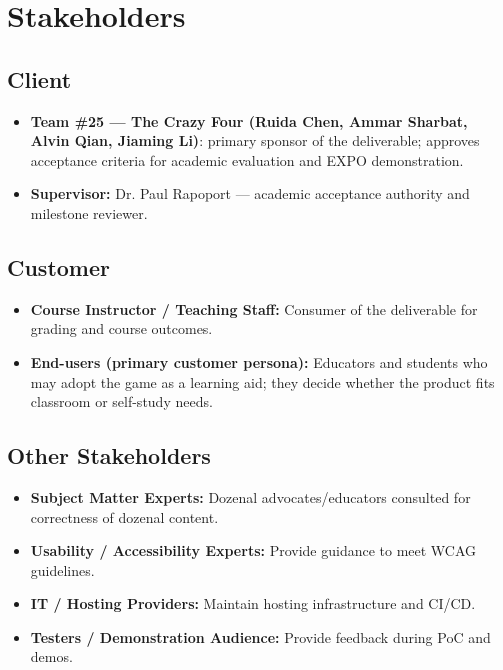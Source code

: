 \documentclass[12pt]{article}
\begin{document}
\section{Stakeholders}

\subsection{Client}
\begin{itemize}
  \item \textbf{Team \#25 — The Crazy Four (Ruida Chen, Ammar Sharbat, Alvin Qian, Jiaming Li)}: primary sponsor of the deliverable; approves acceptance criteria for academic evaluation and EXPO demonstration.
  \item \textbf{Supervisor:} Dr. Paul Rapoport — academic acceptance authority and milestone reviewer.
\end{itemize}

\subsection{Customer}
\begin{itemize}
  \item \textbf{Course Instructor / Teaching Staff:} Consumer of the deliverable for grading and course outcomes.
  \item \textbf{End-users (primary customer persona):} Educators and students who may adopt the game as a learning aid; they decide whether the product fits classroom or self-study needs.
\end{itemize}

\subsection{Other Stakeholders}
\begin{itemize}
  \item \textbf{Subject Matter Experts:} Dozenal advocates/educators consulted for correctness of dozenal content.
  \item \textbf{Usability / Accessibility Experts:} Provide guidance to meet WCAG guidelines.
  \item \textbf{IT / Hosting Providers:} Maintain hosting infrastructure and CI/CD.
  \item \textbf{Testers / Demonstration Audience:} Provide feedback during PoC and demos.
\end{itemize}
\end{document}

